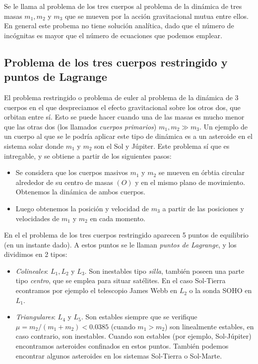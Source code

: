 Se le llama al problema de los tres cuerpos al problema de la dinámica de tres masas $m_1,m_2$ y $m_3$ que se mueven por la acción gravitacional mutua entre ellos. En general este probema no tiene solución analítica, dado que el número de incógnitas es mayor que el número de ecuaciones que podemos emplear.

\subsection{Problema de los tres cuerpos restringido y puntos de Lagrange}

El problema restringido o problema de euler al problema de la dinámica de 3 cuerpos en el que despreciamos el efecto gravitacional sobre los otros dos, que orbitan entre sí. Esto se puede hacer cuando una de las masas es mucho menor que las otras dos (los llamados \textit{cuerpos primarios}) $m_1,m_2\gg m_3$. Un ejemplo de un cuerpo al que se le podría aplicar este tipo de dinámica es a un asteroide en el sistema solar donde $m_1$ y $m_2$ son el Sol y Júpiter. Este problema sí que es intregable, y se obtiene a partir de los siguientes pasos:

\begin{itemize}
	\item Se considera que los cuerpos masivos $m_1$ y $m_2$ se mueven en órbtia circular alrededor de su centro de masas $(O)$ y en el mismo plano de movimiento. Obtenemos la dinámica de ambos cuerpos.
	\item Luego obtenemos la posición y velocidad de $m_3$ a partir de las posiciones y velocidades de $m_1$ y $m_2$ en cada momento.
\end{itemize}
En el el problema de los tres cuerpos restringido aparecen 5 puntos de equilibrio (en un instante dado). A estos puntos se le llaman \textit{puntos de Lagrange}, y los dividimos en 2 tipos:

\begin{itemize}
	\item \textit{Colineales}: $L_1,L_2$ y $L_3$. Son inestables tipo \textit{silla}, también poseen una parte tipo \textit{centro}, que se emplea para situar satélites. En el caso Sol-Tierra econtramos por ejemplo el telescopio James Webb en $L_2$ o la sonda SOHO en $L_1$.
	\item \textit{Triangulares}: $L_4$ y $L_5$. Son estables siempre que se verifique $\mu=m_2/(m_1+m_2)<0.0385$ (cuando $m_1>m_2$) son linealmente estables, en caso contrario, son inestables. Cuando son estables (por ejemplo, Sol-Júpiter) encontramos asteroides confinados en estos puntos. También podemos encontrar algunos asteroides en los sistemas Sol-Tierra o Sol-Marte.
\end{itemize}






